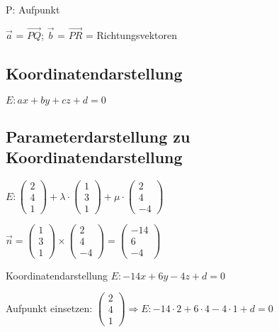 \begin{multicols*}{3}
    {P: Aufpunkt}

    {$ \vec{a}$ = $\overrightarrow{PQ} $; $ \vec{b}$ = $\overrightarrow{PR} $ = Richtungsvektoren}



    \subsection{Koordinatendarstellung}
    {$E: ax + by + cz + d = 0 $}

    \subsection{Parameterdarstellung zu Koordinatendarstellung}

    $ E: \begin{pmatrix}
            2 \\
            4 \\
            1
        \end{pmatrix} + \lambda \cdot
        \begin{pmatrix}
            1 \\
            3 \\
            1
        \end{pmatrix} + \mu \cdot
        \begin{pmatrix}
            2 \\
            4 \\
            -4
        \end{pmatrix}$

    $\vec{n}=
        \begin{pmatrix}
            1 \\
            3 \\
            1
        \end{pmatrix} \times \begin{pmatrix}
            2 \\
            4 \\
            -4
        \end{pmatrix} = \begin{pmatrix}
            -14 \\
            6   \\
            -4
        \end{pmatrix} $

     Koordinatendarstellung $ E: -14x + 6y - 4z + d = 0$

     Aufpunkt einsetzen: $\begin{pmatrix}
            2 \\
            4 \\
            1
        \end{pmatrix} 	\Rightarrow  E: -14 \cdot 2  + 6 \cdot 4 - 4\cdot 1 + d = 0 $


\end{multicols*}
